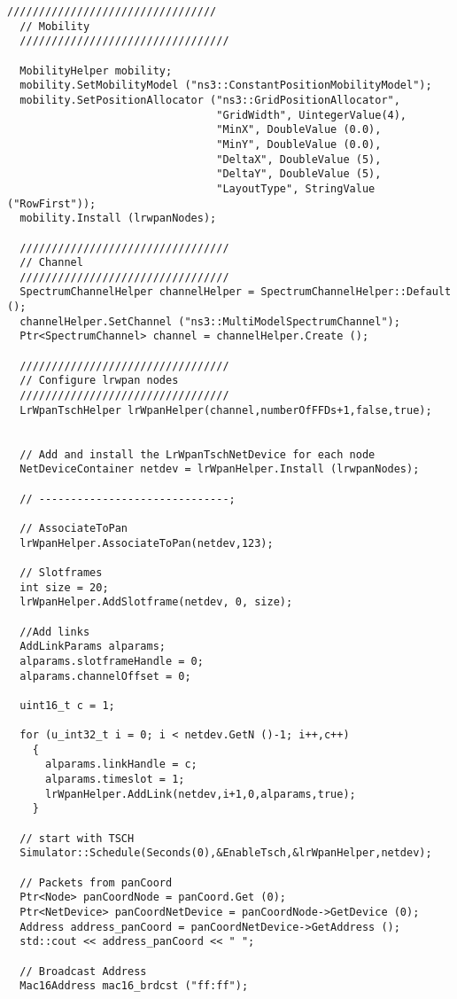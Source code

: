 \begin{lstlisting}[frame=single]
  /////////////////////////////////
  // Mobility
  /////////////////////////////////

  MobilityHelper mobility;
  mobility.SetMobilityModel ("ns3::ConstantPositionMobilityModel");
  mobility.SetPositionAllocator ("ns3::GridPositionAllocator",
                                 "GridWidth", UintegerValue(4),
                                 "MinX", DoubleValue (0.0),
                                 "MinY", DoubleValue (0.0),
                                 "DeltaX", DoubleValue (5),
                                 "DeltaY", DoubleValue (5),
                                 "LayoutType", StringValue ("RowFirst"));
  mobility.Install (lrwpanNodes);

  /////////////////////////////////
  // Channel
  /////////////////////////////////
  SpectrumChannelHelper channelHelper = SpectrumChannelHelper::Default ();
  channelHelper.SetChannel ("ns3::MultiModelSpectrumChannel");
  Ptr<SpectrumChannel> channel = channelHelper.Create ();

  /////////////////////////////////
  // Configure lrwpan nodes
  /////////////////////////////////
  LrWpanTschHelper lrWpanHelper(channel,numberOfFFDs+1,false,true);


  // Add and install the LrWpanTschNetDevice for each node
  NetDeviceContainer netdev = lrWpanHelper.Install (lrwpanNodes);

  // ------------------------------;

  // AssociateToPan
  lrWpanHelper.AssociateToPan(netdev,123);

  // Slotframes
  int size = 20;
  lrWpanHelper.AddSlotframe(netdev, 0, size);

  //Add links
  AddLinkParams alparams;
  alparams.slotframeHandle = 0;
  alparams.channelOffset = 0;

  uint16_t c = 1;

  for (u_int32_t i = 0; i < netdev.GetN ()-1; i++,c++)
    {
      alparams.linkHandle = c;
      alparams.timeslot = 1;
      lrWpanHelper.AddLink(netdev,i+1,0,alparams,true);
    }

  // start with TSCH
  Simulator::Schedule(Seconds(0),&EnableTsch,&lrWpanHelper,netdev);

  // Packets from panCoord
  Ptr<Node> panCoordNode = panCoord.Get (0);
  Ptr<NetDevice> panCoordNetDevice = panCoordNode->GetDevice (0);
  Address address_panCoord = panCoordNetDevice->GetAddress ();
  std::cout << address_panCoord << " ";

  // Broadcast Address
  Mac16Address mac16_brdcst ("ff:ff");


\end{lstlisting}
